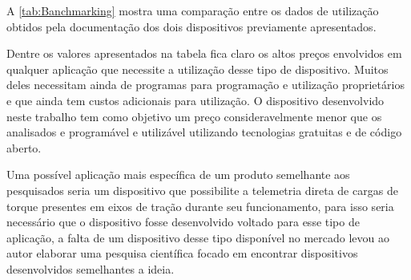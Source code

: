 A \autoref{tab:Banchmarking} mostra uma comparação entre os dados de utilização obtidos pela documentação dos dois dispositivos previamente apresentados.

\begin{table}[!ht]
    \caption{Benchmarking entre dispositivos encontrados}
    \label{tab:Banchmarking}
    \centering
\end{table}

Dentre os valores apresentados na tabela fica claro os altos preços envolvidos em qualquer aplicação que necessite a utilização desse tipo de dispositivo.
Muitos deles necessitam ainda de programas para programação e utilização proprietários e que ainda tem custos adicionais para utilização.
O dispositivo desenvolvido neste trabalho tem como objetivo um preço consideravelmente menor que os analisados e programável e utilizável utilizando tecnologias gratuitas
e de código aberto.

Uma possível aplicação mais específica de um produto semelhante aos pesquisados seria um dispositivo que possibilite a telemetria direta de cargas de torque presentes em
eixos de tração durante seu funcionamento, para isso seria necessário que o dispositivo fosse desenvolvido voltado para esse tipo de aplicação, a falta de um dispositivo
desse tipo disponível no mercado levou ao autor elaborar uma pesquisa científica focado em encontrar dispositivos desenvolvidos semelhantes a ideia.


